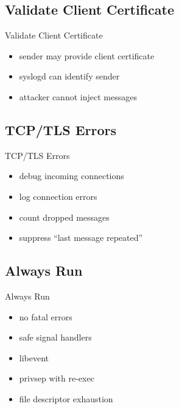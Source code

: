 \documentclass[14pt]{beamer}
\begin{document}
\subsection{Validate Client Certificate}
\begin{frame}{Validate Client Certificate}
\begin{itemize}
    \item sender may provide client certificate
    \item syslogd can identify sender
    \item attacker cannot inject messages
\end{itemize}
\end{frame}

\subsection{TCP/TLS Errors}
\begin{frame}{TCP/TLS Errors}
\begin{itemize}
    \item debug incoming connections
    \item log connection errors
    \item count dropped messages
    \item suppress ``last message repeated''
\end{itemize}
\end{frame}

\subsection{Always Run}
\begin{frame}{Always Run}
\begin{itemize}
    \item no fatal errors
    \item safe signal handlers
    \item libevent
    \item privsep with re-exec
    \item file descriptor exhaustion
\end{itemize}
\end{frame}
\end{document}
